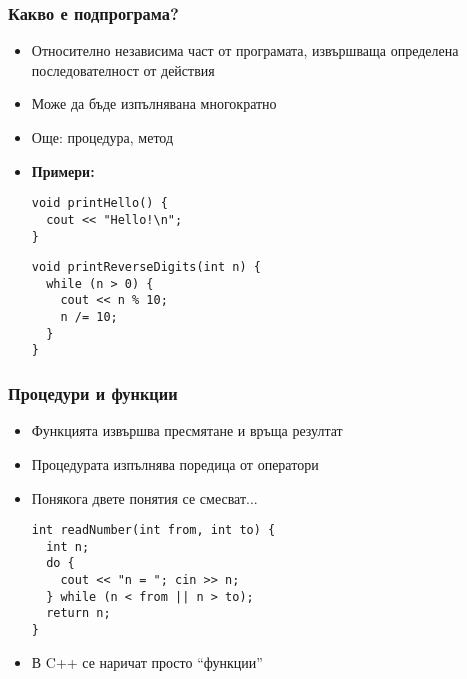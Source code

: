 \documentclass[alsotrans]{beamerswitch}
\begin{document}
\begin{frame}[fragile]
  \frametitle{Какво е подпрограма?}

  \begin{itemize}[<+->]
  \item Относително независима част от програмата, извършваща определена последователност от действия
  \item Може да бъде изпълнявана многократно
  \item Още: процедура, метод
  \item \textbf{Примери:}
\begin{lstlisting}
void printHello() {
  cout << "Hello!\n";
}
\end{lstlisting}
\onslide<+->
\begin{lstlisting}
void printReverseDigits(int n) {
  while (n > 0) {
    cout << n % 10;
    n /= 10;
  }
}
\end{lstlisting}
\end{itemize}
\end{frame}

\begin{frame}[fragile]
  \frametitle{Процедури и функции}

  \begin{itemize}[<+->]
  \item Функцията извършва пресмятане и връща резултат
  \item Процедурата изпълнява поредица от оператори
  \item Понякога двете понятия се смесват...
\begin{lstlisting}
int readNumber(int from, int to) {
  int n;
  do {
    cout << "n = "; cin >> n;
  } while (n < from || n > to);
  return n;
}
\end{lstlisting}
  \item В C++ се наричат просто ``функции''
  \end{itemize}
\end{frame}
\end{document}
